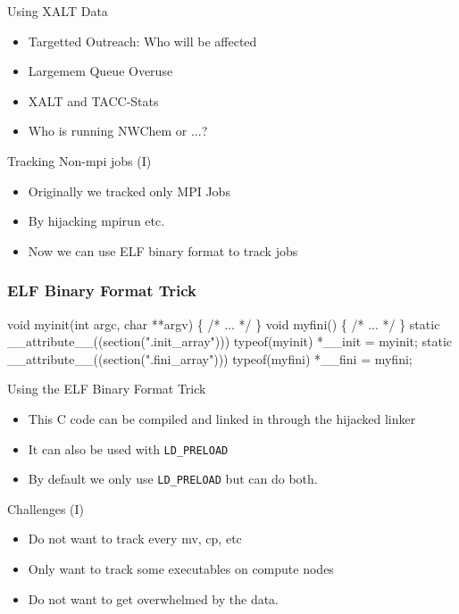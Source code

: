 \documentclass{beamer}
\begin{document}
\begin{frame}{Using XALT Data}
  \begin{itemize}
    \item Targetted Outreach: Who will be affected
    \item Largemem Queue Overuse
    \item XALT and TACC-Stats
    \item Who is running NWChem or ...? 
  \end{itemize}
\end{frame}

\begin{frame}{Tracking Non-mpi jobs (I)}
  \begin{itemize}
    \item Originally we tracked only MPI Jobs
    \item By hijacking mpirun etc.
    \item Now we can use ELF binary format to track jobs
  \end{itemize}
\end{frame}

\begin{frame}[fragile]
    \frametitle{ELF Binary Format Trick}
 {\small
    \begin{semiverbatim}
void myinit(int argc, char **argv)
\{
  /* ... */
\}
void myfini()
\{
  /* ... */
\}
  static __attribute__((section(".init_array")))
       typeof(myinit) *__init = myinit;
  static __attribute__((section(".fini_array")))
       typeof(myfini) *__fini = myfini;
    \end{semiverbatim}
}
\end{frame}

\begin{frame}{Using the ELF Binary Format Trick}
  \begin{itemize}
    \item This C code can be compiled and linked in through the hijacked linker
    \item It can also be used with \texttt{LD\_PRELOAD}
    \item By default we only use \texttt{LD\_PRELOAD} but can do both.
  \end{itemize}
\end{frame}

\begin{frame}{Challenges (I)}
  \begin{itemize}
    \item Do not want to track every mv, cp, etc
    \item Only want to track some executables on compute nodes
    \item Do not want to get overwhelmed by the data. 
  \end{itemize}
\end{frame}
\end{document}
